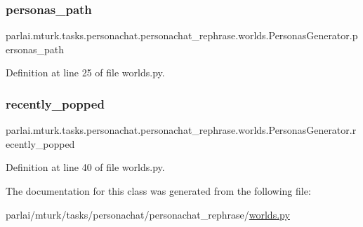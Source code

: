\subsubsection{\texorpdfstring{personas\+\_\+path}{personas\_path}}
{\footnotesize\ttfamily parlai.\+mturk.\+tasks.\+personachat.\+personachat\+\_\+rephrase.\+worlds.\+Personas\+Generator.\+personas\+\_\+path}



Definition at line 25 of file worlds.\+py.

\mbox{\label{classparlai_1_1mturk_1_1tasks_1_1personachat_1_1personachat__rephrase_1_1worlds_1_1PersonasGenerator_af672da71808e22edc2bbb5ba41c1af13}} 
\subsubsection{\texorpdfstring{recently\+\_\+popped}{recently\_popped}}
{\footnotesize\ttfamily parlai.\+mturk.\+tasks.\+personachat.\+personachat\+\_\+rephrase.\+worlds.\+Personas\+Generator.\+recently\+\_\+popped}



Definition at line 40 of file worlds.\+py.



The documentation for this class was generated from the following file\+:\begin{DoxyCompactItemize}
\item 
parlai/mturk/tasks/personachat/personachat\+\_\+rephrase/\hyperlink{parlai_2mturk_2tasks_2personachat_2personachat__rephrase_2worlds_8py}{worlds.\+py}\end{DoxyCompactItemize}
